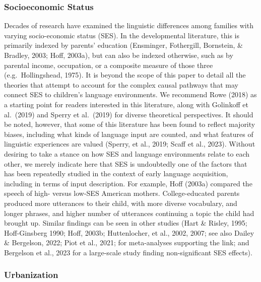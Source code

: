 \documentclass[
  man,floatsintext]{apa6}
\begin{document}
\subsubsection{Socioeconomic Status}\label{socioeconomic-status}

Decades of research have examined the linguistic differences among families with varying socio-economic status (SES). In the developmental literature, this is primarily indexed by parents' education (Ensminger, Fothergill, Bornstein, \& Bradley, 2003; Hoff, 2003a), but can also be indexed otherwise, such as by parental income, occupation, or a composite measure of those three (e.g.~Hollingshead, 1975).
It is beyond the scope of this paper to detail all the theories that attempt to account for the complex causal pathways that may connect SES to children's language environments. We recommend Rowe (2018) as a starting point for readers interested in this literature, along with Golinkoff et al.~(2019) and Sperry et al.~(2019) for diverse theoretical perspectives. It should be noted, however, that some of this literature has been found to reflect majority biases, including what kinds of language input are counted, and what features of linguistic experiences are valued (Sperry, et al., 2019; Scaff et al., 2023). Without desiring to take a stance on how SES and language environments relate to each other, we merely indicate here that SES is undoubtedly one of the factors that has been repeatedly studied in the context of early language acquisition, including in terms of input description. For example, Hoff (2003a) compared the speech of high- versus low-SES American mothers. College-educated parents produced more utterances to their child, with more diverse vocabulary, and longer phrases, and higher number of utterances continuing a topic the child had brought up. Similar findings can be seen in other studies (Hart \& Risley, 1995; Hoff-Ginsberg 1990; Hoff, 2003b; Huttenlocher, et al., 2002, 2007; see also Dailey \& Bergelson, 2022; Piot et al., 2021; for meta-analyses supporting the link; and Bergelson et al., 2023 for a large-scale study finding non-significant SES effects).

\subsubsection{Urbanization}\label{urbanization}
\end{document}
